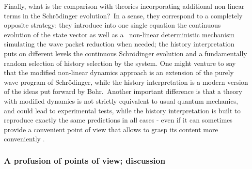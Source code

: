 \documentclass[12pt,onecolumn]{article}%
\begin{document}
Finally, what is the comparison with theories incorporating additional
non-linear terms in the Schr\"{o}dinger evolution?\ In a sense, they
correspond to a completely opposite strategy: they introduce into one single
equation the continuous evolution of the state vector as well as a
\ non-linear deterministic mechanism simulating the wave packet reduction when
needed; the history interpretation puts on different levels the continuous
Schr\"{o}dinger evolution and a fundamentally random selection of history
selection by the system. One might venture to say that the modified non-linear
dynamics approach is an extension of the purely wave program of
Schr\"{o}dinger, while the history interpretation is a modern version of the
ideas put forward by Bohr.\ Another important difference is that a theory with
modified dynamics is not strictly equivalent to usual quantum mechanics, and
could lead to experimental tests, while the history interpretation is built to
reproduce exactly the same predictions in all cases - even if it can sometimes
provide a convenient point of view that allows to grasp its content more
conveniently \cite{Griffiths-comput}.

\subsubsection{A profusion of points of view; discussion}
\end{document}
